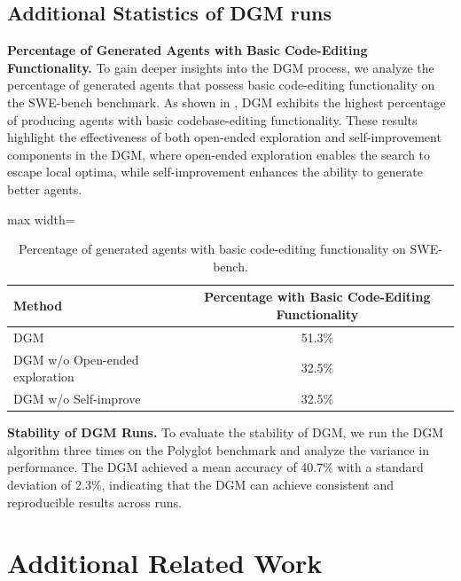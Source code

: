 \documentclass{article} %
\begin{document}
\subsection{Additional Statistics of DGM runs}
\textbf{Percentage of Generated Agents with Basic Code-Editing Functionality.}
To gain deeper insights into the DGM process, we analyze the percentage of generated agents that possess basic code-editing functionality on the SWE-bench benchmark. As shown in , DGM exhibits the highest percentage of producing agents with basic codebase-editing functionality. These results highlight the effectiveness of both open-ended exploration and self-improvement components in the DGM, where open-ended exploration enables the search to escape local optima, while self-improvement enhances the ability to generate better agents.

\begin{table}[H]
\centering
\caption{Percentage of generated agents with basic code-editing functionality on SWE-bench.}
\begin{adjustbox}{max width=\textwidth}
\begin{tabular}{lc}
\toprule
\textbf{Method} & \textbf{Percentage with Basic Code-Editing Functionality} \\
\midrule
DGM & 51.3\% \\
DGM w/o Open-ended exploration & 32.5\% \\
DGM w/o Self-improve & 32.5\% \\
\bottomrule
\end{tabular}
\end{adjustbox}
\label{tab:code_editing}
\end{table}

\textbf{Stability of DGM Runs.}
To evaluate the stability of DGM, we run the DGM algorithm three times on the Polyglot benchmark and analyze the variance in performance. The DGM achieved a mean accuracy of 40.7\% with a standard deviation of 2.3\%, indicating that the DGM can achieve consistent and reproducible results across runs.


\section{Additional Related Work}
\label{app:related}
\end{document}
